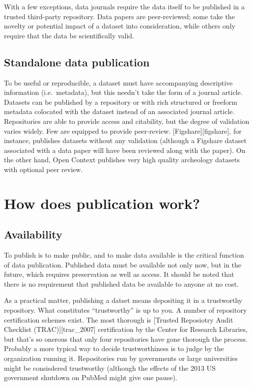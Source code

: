 \documentclass[10pt,a4paper,twocolumn]{article}
\begin{document}
With a few exceptions, data journals require the data itself to be published in a trusted third-party repository. 
Data papers are peer-reviewed; some take the novelty or potential impact of a dataset into consideration, while others only require that the data be scientifically valid.

\subsection*{Standalone data publication}\label{standalone-data-publication}

To be useful or reproducible, a dataset must have accompanying descriptive information (i.e.~metadata), but this needn't take the form of a journal article. 
Datasets can be published by a repository or with rich structured or freeform metadata colocated with the dataset instead of an associated journal article. Repositories are able to provide access and citability, but the degree of validation varies widely. 
Few are equipped to provide peer-review. {[}Figshare{]}{[}figshare{]}, for instance, publishes datasets without any validation (although a Figshare dataset associated with a data paper will have been reviewed along with the paper). 
On the other hand, Open Context publishes very high quality archeology datasets with optional peer review.

\section*{How does publication work?}\label{how-does-publication-work}

\subsection*{Availability}\label{availability}

To publish is to make public, and to make data available is the critical function of data publication. 
Published data must be available not only now, but in the future, which requires preservation as well as access. 
It should be noted that there is no requirement that published data be available to anyone at no cost.

As a practical matter, publishing a datset means depositing it in a trustworthy repository. 
What constitutes ``trustworthy'' is up to you. 
A number of repository certification schemes exist. The most thorough is {[}Trusted Reposiotry Audit Checklist (TRAC){]}{[}trac\_2007{]} certification by the Center for Research Libraries, but that's so onerous that only four repositories have gone thorough the process. 
Probably a more typical way to decide trustworthiness is to judge by the organization running it. 
Repositories run by governments or large universities might be consisdered trustworthy (although the effects of the 2013 US government shutdown on PubMed might give one pause).
\end{document}

